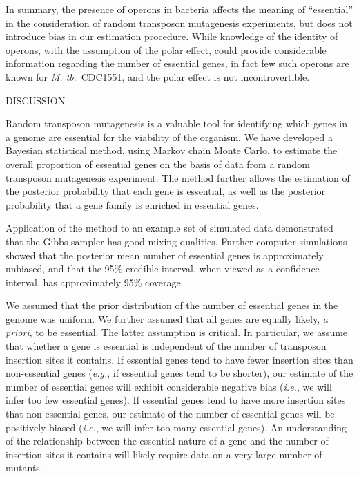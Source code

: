 \documentclass[letterpaper]{article}
\begin{document}
\begin{multicols}{2}
In summary, the presence of operons in bacteria affects the meaning of
``essential'' in the consideration of random transposon mutagenesis
experiments, but does not introduce bias in our estimation procedure.
While knowledge of the identity of operons, with the assumption of the
polar effect, could provide considerable information regarding the
number of essential genes, in fact few such operons are known for
\emph{M. tb}.\ CDC1551, and the polar effect is not incontrovertible.


\smallskip \bigskip
\centerline{DISCUSSION}
\smallskip

Random transposon mutagenesis is a valuable tool for identifying which
genes in a genome are essential for the viability of the organism.  We
have developed a Bayesian statistical method, using Markov chain Monte
Carlo, to estimate the overall proportion of essential genes on the
basis of data from a random transposon mutagenesis experiment.  The
method further allows the estimation of the posterior probability that
each gene is essential, as well as the posterior probability that a
gene family is enriched in essential genes.

Application of the method to an example set of simulated data
demonstrated that the Gibbs sampler has good mixing qualities.
Further computer simulations showed that the posterior mean number of
essential genes is approximately unbiased, and that the 95\% credible
interval, when viewed as a confidence interval, has approximately 95\%
coverage.  

We assumed that the prior distribution of the number of essential
genes in the genome was uniform.  We further assumed that all genes
are equally likely, \emph{a priori}, to be essential.  The latter
assumption is critical.  In particular, we assume that whether a gene
is essential is independent of the number of transposon insertion
sites it contains. If essential genes tend to have fewer insertion
sites than non-essential genes (\emph{e.g.}, if essential genes tend
to be shorter), our estimate of the number of essential genes will
exhibit considerable negative bias (\emph{i.e.}, we will infer too few
essential genes).  If essential genes tend to have more insertion
sites that non-essential genes, our estimate of the number of
essential genes will be positively biased (\emph{i.e.}, we will infer
too many essential genes).  An understanding of the relationship
between the essential nature of a gene and the number of insertion
sites it contains will likely require data on a very large number of
mutants.


\end{multicols}
\end{document}
